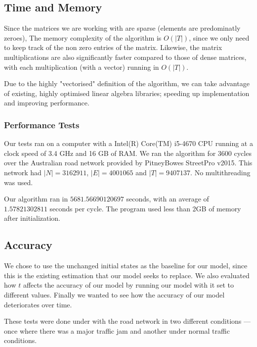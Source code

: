 \documentclass[a4paper]{article}
\begin{document}
\subsection{Time and Memory}
Since the matrices we are working with are sparse (elements are predominatly zeroes), The memory complexity of the algorithm is $O(|T|)$, since we only need to keep track of
the non zero entries of the matrix. Likewise, the matrix multiplications are also significantly faster compared to those of dense matrices, with each multiplication 
(with a vector) running in $O(|T|)$. 

Due to the highly "vectorised" definition of the algorithm, we can take advantage of existing, highly optimised linear algebra libraries; speeding up implementation and
improving performance.

\subsubsection{Performance Tests}
Our tests ran on a computer with a Intel(R) Core(TM) i5-4670 CPU running at a clock speed of 3.4 GHz and 16 GB of RAM.
We ran the algorithm for 3600 cycles over the Australian road network provided by PitneyBowes StreetPro v2015. 
This network had $|N| = 3162911$, $|E| = 4001065$ and $|T| = 9407137$.
No multithreading was used. 

Our algorithm ran in $5681.56690120697$
seconds, with an average of $1.57821302811$
seconds per cycle. The program used less than 2GB of memory after initialization.

\subsection{Accuracy}
We chose to use the unchanged initial states as the baseline for our model, since this is the existing estimation that our model seeks to replace.
We also evaluated how $t$ affects the accuracy of our model by running our model with it set to different values.
Finally we wanted to see how the accuracy of our model deteriorates over time. 

These tests were done under with the road network in two different conditions --- once where there was a major traffic jam and another under normal traffic conditions.
\end{document}
